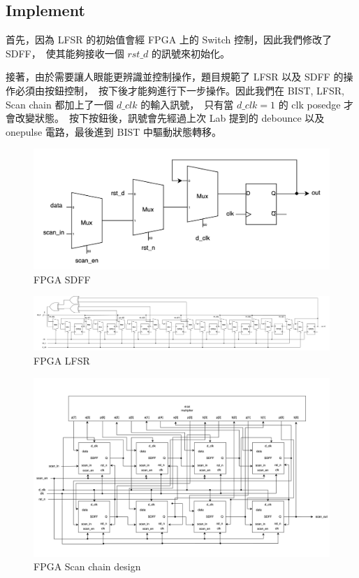 \documentclass[10.5pt,compsoc,UTF8]{CjC}
\theoremstyle{mystyle}
\begin{document}
\subsection{Implement}

首先，因為 LFSR 的初始值會經 FPGA 上的 Switch 控制，因此我們修改了 SDFF，\
使其能夠接收一個 $rst\_d$ 的訊號來初始化。
\par
接著，由於需要讓人眼能更辨識並控制操作，題目規範了 LFSR 以及 SDFF 的操作必須由按鈕控制，\
按下後才能夠進行下一步操作。因此我們在 BIST, LFSR, Scan chain 都加上了一個 $d\_clk$ 的輸入訊號，\
只有當 $d\_clk = 1$ 的 clk posedge 才會改變狀態。\
按下按鈕後，訊號會先經過上次 Lab 提到的 debounce 以及 onepulse 電路，最後進到 BIST 中驅動狀態轉移。

\begin{figure}[h!]
  \centering
  \includegraphics[width=\textwidth]{./img/FPGA-SDFF.png}
  \caption{FPGA SDFF}
  \label{fig:Q4-SDFF}
\end{figure}

\begin{figure}[h!]
  \centering
  \includegraphics[width=\textwidth]{./img/FPGA-LFSR.png}
  \caption{FPGA LFSR}
  \label{fig:Q4-LFSR}
\end{figure}

\newpage

\begin{figure}[h!]
  \centering
  \includegraphics[width=\textwidth]{./img/FPGA-SCD.png}
  \caption{FPGA Scan chain design}
  \label{fig:Q4-SCD}
\end{figure}
\end{document}
